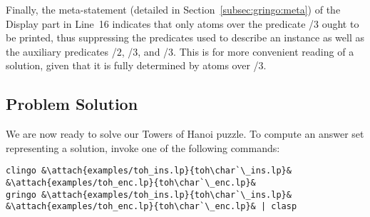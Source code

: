 Finally, the meta-statement  (detailed in Section~\ref{subsec:gringo:meta})
of the Display part in Line~16
indicates that only atoms over the predicate /$3$ ought to be printed,
thus suppressing the predicates used to describe an instance as well as
the auxiliary predicates /$2$, /$3$, and /$3$.
This is for more convenient reading of a solution,
given that it is fully determined by atoms over /$3$.

\subsection{Problem Solution}

We are now ready to solve our Towers of Hanoi puzzle. 
To compute an answer set representing a solution,
invoke one of the following commands:%
%
\begin{lstlisting}[numbers=none,escapechar=&]
clingo &\attach{examples/toh_ins.lp}{toh\char`\_ins.lp}& &\attach{examples/toh_enc.lp}{toh\char`\_enc.lp}&
gringo &\attach{examples/toh_ins.lp}{toh\char`\_ins.lp}& &\attach{examples/toh_enc.lp}{toh\char`\_enc.lp}& | clasp
\end{lstlisting}

